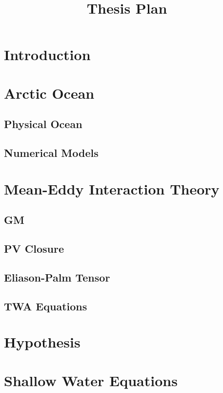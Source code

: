 \documentclass[10pt,a4paper]{article}
\title{Thesis Plan}
\begin{document}
\maketitle


\section{Introduction}

\section{Arctic Ocean}

\subsection{Physical Ocean}

\subsection{Numerical Models}

\section{Mean-Eddy Interaction Theory}

\subsection{GM}

\subsection{PV Closure}

\subsection{Eliason-Palm Tensor}

\subsection{TWA Equations}

\section{Hypothesis}

\section{Shallow Water Equations}
\end{document}
